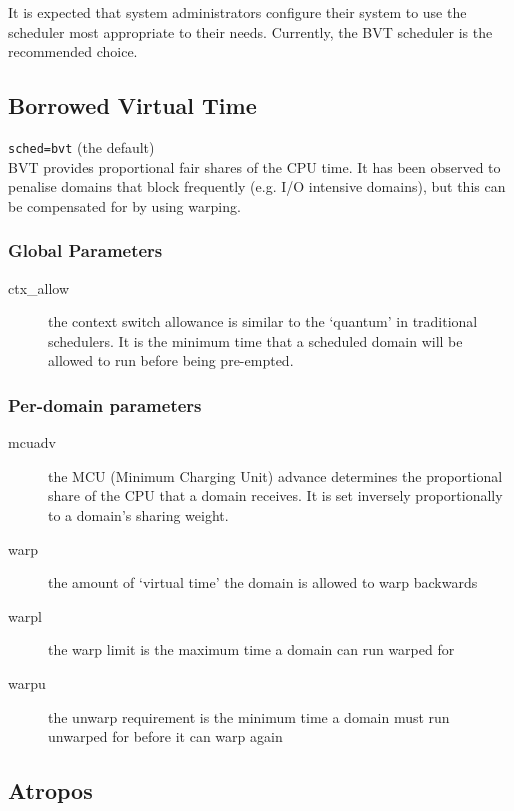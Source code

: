 \documentclass[11pt,twoside,final,openright]{report}
\begin{document}
{It is expected that system administrators configure their system to
use the scheduler most appropriate to their needs.  Currently, the BVT
scheduler is the recommended choice. 

\subsection{Borrowed Virtual Time}

{\tt sched=bvt} (the default) \\ 

BVT provides proportional fair shares of the CPU time.  It has been
observed to penalise domains that block frequently (e.g. I/O intensive
domains), but this can be compensated for by using warping. 

\subsubsection{Global Parameters}

\begin{description}
\item[ctx\_allow]
  the context switch allowance is similar to the `quantum'
  in traditional schedulers.  It is the minimum time that
  a scheduled domain will be allowed to run before being
  pre-empted. 
\end{description}

\subsubsection{Per-domain parameters}

\begin{description}
\item[mcuadv]
  the MCU (Minimum Charging Unit) advance determines the
  proportional share of the CPU that a domain receives.  It
  is set inversely proportionally to a domain's sharing weight.
\item[warp]
  the amount of `virtual time' the domain is allowed to warp
  backwards
\item[warpl]
  the warp limit is the maximum time a domain can run warped for
\item[warpu]
  the unwarp requirement is the minimum time a domain must
  run unwarped for before it can warp again
\end{description}

\subsection{Atropos}

}
\end{document}
